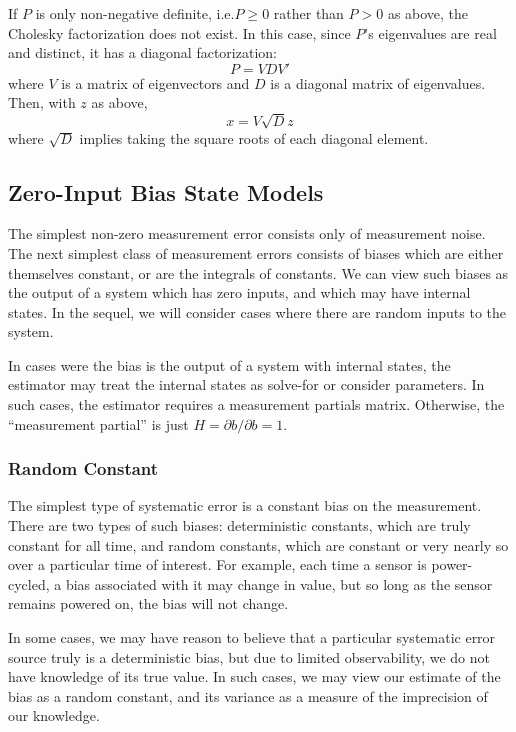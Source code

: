 If $P$ is only non-negative definite, i.e.\@ $P \geq 0$ rather than $P > 0$ as above, the Cholesky factorization does not exist.  In this case, since $P$'s eigenvalues are real and distinct, it has a diagonal factorization:
\begin{equation}
	P = V D V'
\end{equation}
where $V$ is a matrix of eigenvectors and $D$ is a diagonal matrix of eigenvalues.
Then, with $z$ as above,
\begin{equation}
	x = V \sqrt{D} z
\end{equation}
where $\sqrt{D}$ implies taking the square roots of each diagonal element.

\subsection{Zero-Input Bias State Models}

The simplest non-zero measurement error consists only of measurement noise.  The next simplest class of measurement errors consists of biases which are either themselves constant, or are the integrals of constants.  We can view such biases as the output of a system which has zero inputs, and which may have internal states.  In the sequel, we will consider cases where there are random inputs to the system.

In cases were the bias is the output of a system with internal states, the estimator may treat the internal states as solve-for or consider parameters.  In such cases, the estimator requires a measurement partials matrix.  Otherwise, the ``measurement partial'' is just $H = \partial b / \partial b = 1$.

\subsubsection{Random Constant}

The simplest type of systematic error is a constant bias on the measurement.  There are two types of such biases: deterministic constants, which are truly constant for all time, and random constants, which are constant or very nearly so over a particular time of interest.  For example, each time a sensor is power-cycled, a bias associated with it may change in value, but so long as the sensor remains powered on, the bias will not change.

In some cases, we may have reason to believe that a particular systematic error source truly is a deterministic bias, but due to limited observability, we do not have knowledge of its true value.  In such cases, we may view our estimate of the bias as a random constant, and its variance as a measure of the imprecision of our knowledge.

